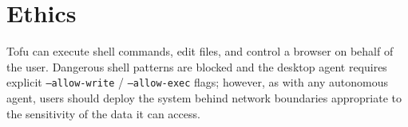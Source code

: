 \documentclass[11pt]{article}
\begin{document}
\section*{Ethics}

Tofu can execute shell commands, edit files, and control a browser on
behalf of the user. Dangerous shell patterns are blocked and the
desktop agent requires explicit \texttt{--allow-write} /
\texttt{--allow-exec} flags; however, as with any autonomous agent,
users should deploy the system behind network boundaries appropriate
to the sensitivity of the data it can access.



\end{document}
